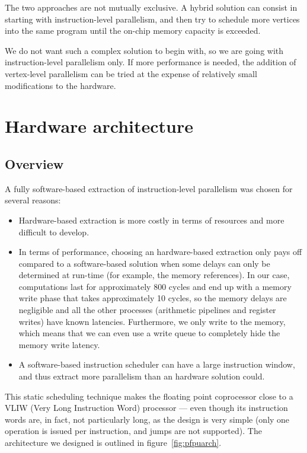 \documentclass[a4paper,11pt]{kthesis}
\begin{document}
The two approaches are not mutually exclusive. A hybrid solution can consist in starting with instruction-level parallelism, and then try to schedule more vertices into the same program until the on-chip memory capacity is exceeded.

We do not want such a complex solution to begin with, so we are going with instruction-level parallelism only. If more performance is needed, the addition of vertex-level parallelism can be tried at the expense of relatively small modifications to the hardware.

\section{Hardware architecture}
\subsection{Overview}
A fully software-based extraction of instruction-level parallelism was chosen for several reasons:
\begin{itemize}
\item Hardware-based extraction is more costly in terms of resources and more difficult to develop.
\item In terms of performance, choosing an hardware-based extraction only pays off compared to a software-based solution when some delays can only be determined at run-time (for example, the memory references). In our case, computations last for approximately 800 cycles and end up with a memory write phase that takes approximately 10 cycles, so the memory delays are negligible and all the other processes (arithmetic pipelines and register writes) have known latencies. Furthermore, we only write to the memory, which means that we can even use a write queue to completely hide the memory write latency.
\item A software-based instruction scheduler can have a large instruction window, and thus extract more parallelism than an hardware solution could.
\end{itemize}

This static scheduling technique makes the floating point coprocessor close to a VLIW (Very Long Instruction Word) processor --- even though its instruction words are, in fact, not particularly long, as the design is very simple (only one operation is issued per instruction, and jumps are not supported). The architecture we designed is outlined in figure~\ref{fig:pfpuarch}.
\end{document}
